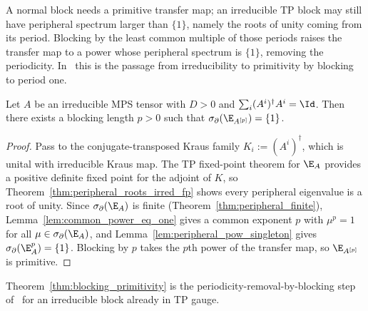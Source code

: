 A normal block needs a primitive transfer map; an irreducible TP block may still
have peripheral spectrum larger than $\{1\}$, namely the roots of unity coming
from its period. Blocking by the least common multiple of those periods raises the
transfer map to a power whose peripheral spectrum is $\{1\}$, removing the
periodicity. In~\cite{Cirac2021Matrix} this is the passage from irreducibility to
primitivity by blocking to period one.

\begin{theorem}\label{thm:blocking_primitivity}
    \leanok
    Let $A$ be an irreducible MPS tensor with $D > 0$ and
    $\sum_i (A^i)^\dagger A^i = \Id$. Then there exists a blocking length $p > 0$
    such that $\sigma_\partial(\E_{A^{[p]}}) = \{1\}$.
\end{theorem}

\begin{proof}\leanok
    Pass to the conjugate-transposed Kraus family $K_i := (A^i)^\dagger$, which is
    unital with irreducible Kraus map. The TP fixed-point theorem for $\E_A$
    provides a positive definite fixed point for the adjoint of $K$, so
    Theorem~\ref{thm:peripheral_roots_irred_fp} shows every peripheral eigenvalue
    is a root of unity. Since $\sigma_\partial(\E_A)$ is finite
    (Theorem~\ref{thm:peripheral_finite}),
    Lemma~\ref{lem:common_power_eq_one} gives a common exponent $p$ with
    $\mu^p = 1$ for all $\mu \in \sigma_\partial(\E_A)$, and
    Lemma~\ref{lem:peripheral_pow_singleton} gives
    $\sigma_\partial(\E_A^p) = \{1\}$. Blocking by $p$ takes the $p$th power of
    the transfer map, so $\E_{A^{[p]}}$ is primitive.
\end{proof}

\begin{remark}\label{rem:blocking_primitivity_appendixA}
    Theorem~\ref{thm:blocking_primitivity} is the periodicity-removal-by-blocking
    step of~\cite[Appendix~A]{Cirac2016MPDO_arXiv} for an irreducible block
    already in TP gauge.
\end{remark}

